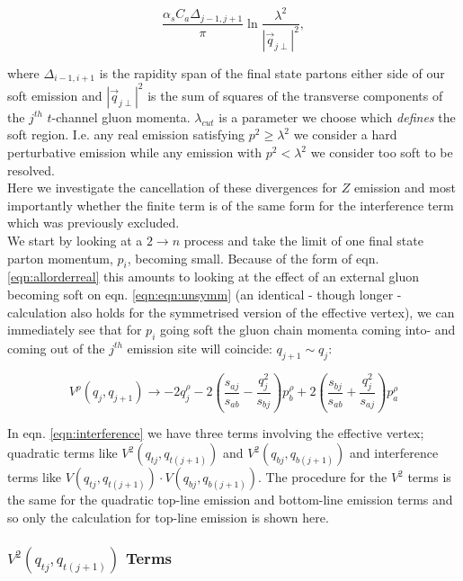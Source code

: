 		\begin{equation}
			\frac{\alpha_s C_a \Delta_{j-1, j+1}}{\pi}\ln{\frac{\lambda^2}{|\vec{q}_{j\perp}|^2}},
		\end{equation}

		where $\Delta_{i-1, i+1}$ is the rapidity span of the final state partons either side of our
		soft emission and $|\vec{q}_{j\perp}|^2$ is the sum of squares of the transverse components of
		the $j^{th}$ $t$-channel gluon momenta.  $\lambda_{cut}$ is a parameter we choose which \emph{defines}
		the soft region.  I.e. any real emission satisfying $p^2 \geq \lambda^2$ we consider a hard perturbative
		emission while any emission with $p^2 < \lambda^2$ we consider too soft to be resolved.\\
		Here we investigate
		the cancellation of these divergences for $Z$ emission and most importantly whether the finite term
		is of the same form for the interference term which was previously excluded.\\We start by looking
		at a $2\rightarrow n$ process and take the limit of one final state parton momentum, $p_i$, becoming
		small.  Because of the form of eqn. \eqref{eqn:allorderreal} this amounts to looking at the
		effect of an external gluon becoming soft on eqn. \eqref{eqn:eqn:unsymm} (an identical - though
		longer - calculation also holds for the symmetrised version of the effective vertex), we can
		immediately see that for $p_i$ going soft the gluon chain momenta coming into- and coming out of
		the $j^{th}$ emission site will coincide: $q_{j+1}\sim q_j$:

		\begin{equation}
			V^\rho(q_j, q_{j+1}) \rightarrow -2q_j^\rho - 2\left(\frac{s_{aj}}{s_{ab}} -
				\frac{q^2_{j}}{s_{bj}}\right)p_b^\rho + 2\left(\frac{s_{bj}}{s_{ab}} +
				\frac{q_j^2}{s_{aj}}\right)p_a^\rho
				\label{eqn:vertexlimit}
		\end{equation}

		In eqn. \eqref{eqn:interference} we have three terms involving the effective vertex;
		quadratic terms like $V^2(q_{tj}, q_{t(j+1)})$ and $V^2(q_{bj}, q_{b(j+1)})$ and interference terms like
		$V(q_{tj}, q_{t(j+1)})\cdot V(q_{bj}, q_{b(j+1)})$.  The procedure for the $V^2$ terms is the same for
		the quadratic top-line emission and bottom-line emission terms and so only the calculation for top-line
		emission is shown here.

		\subsubsection{$V^2(q_{tj}, q_{t(j+1)})$ Terms}

